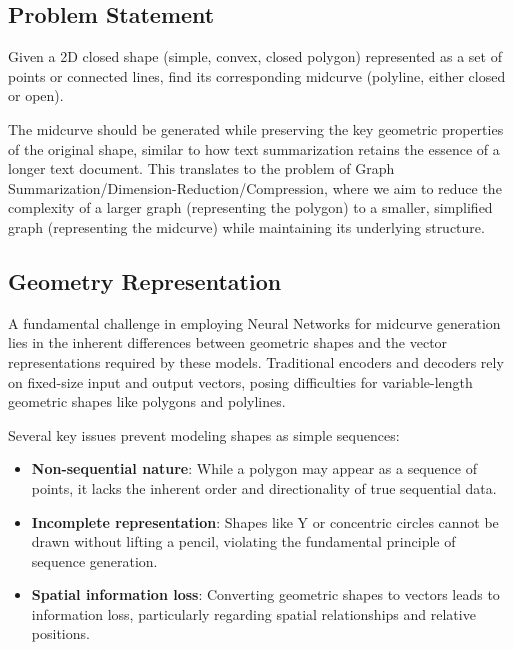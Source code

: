 \documentclass[conference]{IEEEtran}
\begin{document}
\subsection{Problem Statement}
\label{subsec:3}

Given a 2D closed shape (simple, convex, closed polygon) represented as a set of points or connected lines, find its corresponding midcurve (polyline, either closed or open).

The midcurve should be generated while preserving the key geometric properties of the original shape, similar to how text summarization retains the essence of a longer text document. This translates to the problem of Graph Summarization/Dimension-Reduction/Compression, where we aim to reduce the complexity of a larger graph (representing the polygon) to a smaller, simplified graph (representing the midcurve) while maintaining its underlying structure.

\subsection{Geometry Representation}
\label{subsec:4}

A fundamental challenge in employing Neural Networks for midcurve generation lies in the inherent differences between geometric shapes and the vector representations required by these models. Traditional encoders and decoders rely on fixed-size input and output vectors, posing difficulties for variable-length geometric shapes like polygons and polylines.

Several key issues prevent modeling shapes as simple sequences:
\begin{itemize}
\item {\bf Non-sequential nature}: While a polygon may appear as a sequence of points, it lacks the inherent order and directionality of true sequential data.
\item {\bf Incomplete representation}: Shapes like Y or concentric circles cannot be drawn without lifting a pencil, violating the fundamental principle of sequence generation.
\item {\bf Spatial information loss}: Converting geometric shapes to vectors leads to information loss, particularly regarding spatial relationships and relative positions.
\end{itemize}
\end{document}
